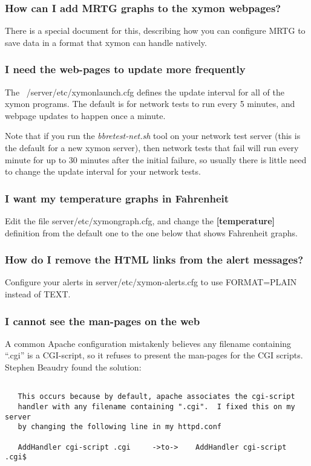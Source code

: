 \subsubsection{How can I add MRTG graphs to the xymon webpages?}


 There is a special document for this, describing how you can configure MRTG to save data in a format that xymon can handle natively.
 
\subsubsection{I need the web-pages to update more frequently}


 The ~/server/etc/xymonlaunch.cfg defines the update interval for all of the xymon programs. The default is for network tests to run every 5 minutes, and webpage updates to happen once a minute.


 Note that if you run the \emph{bbretest-net.sh}
 tool on your network test server (this is the default for a new xymon server), then network tests that fail will run every minute for up to 30 minutes after the initial failure, so usually there is little need to change the update interval for your network tests.
 
\subsubsection{I want my temperature graphs in Fahrenheit}


 Edit the file server/etc/xymongraph.cfg, and change the \textbf{[temperature]}
 definition from the default one to the one below that shows Fahrenheit graphs.
 
\subsubsection{How do I remove the HTML links from the alert messages?}


 Configure your alerts in server/etc/xymon-alerts.cfg to use FORMAT=PLAIN instead of TEXT.
 
\subsubsection{I cannot see the man-pages on the web}


 A common Apache configuration mistakenly believes any filename containing ``.cgi'' is a CGI-script, so it refuses to present the man-pages for the CGI scripts. Stephen Beaudry found the solution:
\begin{verbatim}

   This occurs because by default, apache associates the cgi-script
   handler with any filename containing ".cgi".  I fixed this on my server
   by changing the following line in my httpd.conf

   AddHandler cgi-script .cgi     ->to->    AddHandler cgi-script .cgi$

\end{verbatim}
 
